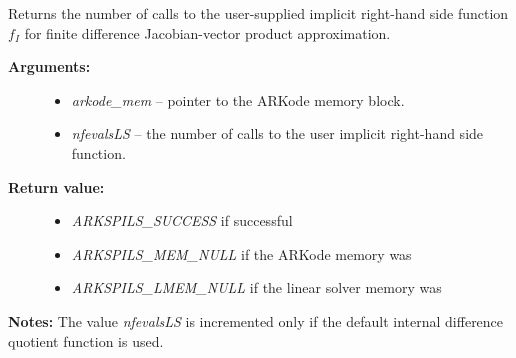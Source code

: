 \documentclass[letterpaper,10pt,english]{sphinxmanual}
\begin{document}
\begin{fulllineitems}
\label{c_interface/User_callable:c.ARKSpilsGetNumRhsEvals}
Returns the number of calls to the user-supplied implicit
right-hand side function \(f_I\) for finite difference
Jacobian-vector product approximation.
\begin{description}
\item[{\textbf{Arguments:}}] \leavevmode\begin{itemize}
\item {} 
\emph{arkode\_mem} -- pointer to the ARKode memory block.

\item {} 
\emph{nfevalsLS} -- the number of calls to the user implicit
right-hand side function.

\end{itemize}

\item[{\textbf{Return value:}}] \leavevmode\begin{itemize}
\item {} 
\emph{ARKSPILS\_SUCCESS} if successful

\item {} 
\emph{ARKSPILS\_MEM\_NULL} if the ARKode memory was 

\item {} 
\emph{ARKSPILS\_LMEM\_NULL} if the linear solver memory was 

\end{itemize}

\end{description}

\textbf{Notes:} The value \emph{nfevalsLS} is incremented only if the default
internal difference quotient function is used.

\end{fulllineitems}

\end{document}
